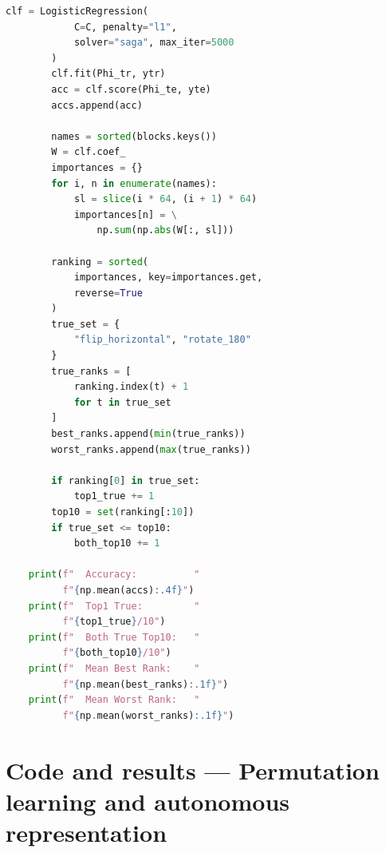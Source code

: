 \documentclass[11pt,a4paper]{report}
\begin{document}
\begin{lstlisting}[language=Python]
        clf = LogisticRegression(
            C=C, penalty="l1",
            solver="saga", max_iter=5000
        )
        clf.fit(Phi_tr, ytr)
        acc = clf.score(Phi_te, yte)
        accs.append(acc)

        names = sorted(blocks.keys())
        W = clf.coef_
        importances = {}
        for i, n in enumerate(names):
            sl = slice(i * 64, (i + 1) * 64)
            importances[n] = \
                np.sum(np.abs(W[:, sl]))

        ranking = sorted(
            importances, key=importances.get,
            reverse=True
        )
        true_set = {
            "flip_horizontal", "rotate_180"
        }
        true_ranks = [
            ranking.index(t) + 1
            for t in true_set
        ]
        best_ranks.append(min(true_ranks))
        worst_ranks.append(max(true_ranks))

        if ranking[0] in true_set:
            top1_true += 1
        top10 = set(ranking[:10])
        if true_set <= top10:
            both_top10 += 1

    print(f"  Accuracy:          "
          f"{np.mean(accs):.4f}")
    print(f"  Top1 True:         "
          f"{top1_true}/10")
    print(f"  Both True Top10:   "
          f"{both_top10}/10")
    print(f"  Mean Best Rank:    "
          f"{np.mean(best_ranks):.1f}")
    print(f"  Mean Worst Rank:   "
          f"{np.mean(worst_ranks):.1f}")
\end{lstlisting}

\section{Code and results --- Permutation learning and autonomous representation}
\end{document}

